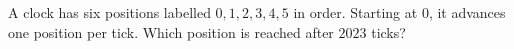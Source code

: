 A clock has six positions labelled $ 0,1,2,3,4,5 $ in order. Starting at $ 0 $, it advances one position per tick. Which position is reached after $ 2023 $ ticks?
